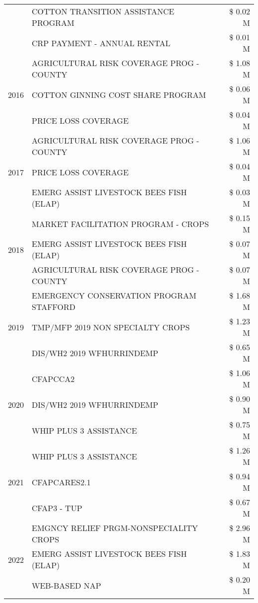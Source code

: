 \begin{tabular}{llr}
 & COTTON TRANSITION ASSISTANCE PROGRAM & \$ 0.02 M \\
 & CRP PAYMENT - ANNUAL RENTAL & \$ 0.01 M \\
\cline{1-3}
\multirow[t]{3}{*}{2016} & AGRICULTURAL RISK COVERAGE PROG - COUNTY & \$ 1.08 M \\
 & COTTON GINNING COST SHARE PROGRAM & \$ 0.06 M \\
 & PRICE LOSS COVERAGE & \$ 0.04 M \\
\cline{1-3}
\multirow[t]{3}{*}{2017} & AGRICULTURAL RISK COVERAGE PROG - COUNTY & \$ 1.06 M \\
 & PRICE LOSS COVERAGE & \$ 0.04 M \\
 & EMERG ASSIST LIVESTOCK BEES FISH (ELAP) & \$ 0.03 M \\
\cline{1-3}
\multirow[t]{3}{*}{2018} & MARKET FACILITATION PROGRAM - CROPS & \$ 0.15 M \\
 & EMERG ASSIST LIVESTOCK BEES FISH (ELAP) & \$ 0.07 M \\
 & AGRICULTURAL RISK COVERAGE PROG - COUNTY & \$ 0.07 M \\
\cline{1-3}
\multirow[t]{3}{*}{2019} & EMERGENCY CONSERVATION PROGRAM STAFFORD & \$ 1.68 M \\
 & TMP/MFP 2019 NON SPECIALTY CROPS & \$ 1.23 M \\
 & DIS/WH2 2019 WFHURRINDEMP & \$ 0.65 M \\
\cline{1-3}
\multirow[t]{3}{*}{2020} & CFAPCCA2 & \$ 1.06 M \\
 & DIS/WH2 2019 WFHURRINDEMP & \$ 0.90 M \\
 & WHIP PLUS 3 ASSISTANCE & \$ 0.75 M \\
\cline{1-3}
\multirow[t]{3}{*}{2021} & WHIP PLUS 3 ASSISTANCE & \$ 1.26 M \\
 & CFAPCARES2.1 & \$ 0.94 M \\
 & CFAP3 - TUP & \$ 0.67 M \\
\cline{1-3}
\multirow[t]{3}{*}{2022} & EMGNCY RELIEF PRGM-NONSPECIALITY CROPS & \$ 2.96 M \\
 & EMERG ASSIST LIVESTOCK BEES FISH (ELAP) & \$ 1.83 M \\
 & WEB-BASED NAP & \$ 0.20 M \\
\cline{1-3}
\bottomrule
\end{tabular}
